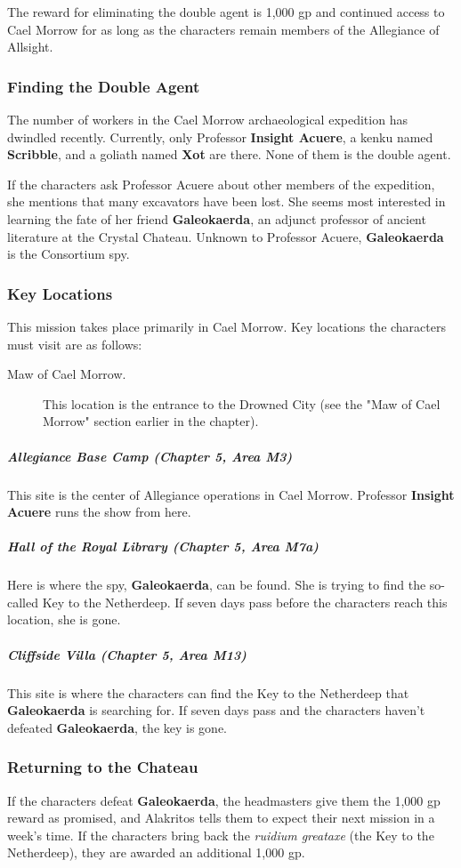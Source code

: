 \documentclass[10pt,a4paper,twoside,fancy,bg=print,twocolumn,openany,nodeprecatedcode]{dndbook}
\begin{document}
The reward for eliminating the double agent is 1,000 gp and continued access to Cael Morrow for as long as the characters remain members of the Allegiance of Allsight.

\subsubsection{Finding the Double Agent}
The number of workers in the Cael Morrow archaeological expedition has dwindled recently. Currently, only Professor \textbf{Insight Acuere}, a kenku named \textbf{Scribble}, and a goliath named \textbf{Xot} are there. None of them is the double agent.

If the characters ask Professor Acuere about other members of the expedition, she mentions that many excavators have been lost. She seems most interested in learning the fate of her friend \textbf{Galeokaerda}, an adjunct professor of ancient literature at the Crystal Chateau. Unknown to Professor Acuere, \textbf{Galeokaerda} is the Consortium spy.

\subsubsection{Key Locations}
This mission takes place primarily in Cael Morrow. Key locations the characters must visit are as follows:


\begin{description}
\item[Maw of Cael Morrow.]
This location is the entrance to the Drowned City (see the "Maw of Cael Morrow" section earlier in the chapter).
\end{description}

\subparagraph{Allegiance Base Camp (Chapter 5, Area M3)}
This site is the center of Allegiance operations in Cael Morrow. Professor \textbf{Insight Acuere} runs the show from here.

\subparagraph{Hall of the Royal Library (Chapter 5, Area M7a)}
Here is where the spy, \textbf{Galeokaerda}, can be found. She is trying to find the so-called Key to the Netherdeep. If seven days pass before the characters reach this location, she is gone.

\subparagraph{Cliffside Villa (Chapter 5, Area M13)}
This site is where the characters can find the Key to the Netherdeep that \textbf{Galeokaerda} is searching for. If seven days pass and the characters haven't defeated \textbf{Galeokaerda}, the key is gone.

\subsubsection{Returning to the Chateau}
If the characters defeat \textbf{Galeokaerda}, the headmasters give them the 1,000 gp reward as promised, and Alakritos tells them to expect their next mission in a week's time. If the characters bring back the \textit{ruidium greataxe} (the Key to the Netherdeep), they are awarded an additional 1,000 gp.
\end{document}
